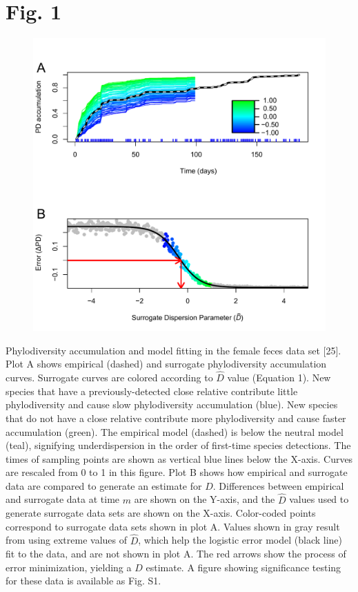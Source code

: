 \documentclass{article}
\begin{document}
\section*{Fig. 1}
\begin{figure}[ht]
	\centering
	\includegraphics[scale=0.80]{../Fig_1.pdf}
\end{figure}
Phylodiversity accumulation and model fitting in the female feces data set [25]. Plot A shows empirical (dashed) and surrogate phylodiversity accumulation curves. Surrogate curves are colored according to \(\hat{D}\) value (Equation 1). New species that have a previously-detected close relative contribute little phylodiversity and cause slow phylodiversity accumulation (blue). New species that do not have a close relative contribute more phylodiversity and cause faster accumulation (green). The empirical model (dashed) is below the neutral model (teal), signifying underdispersion in the order of first-time species detections. The times of sampling points are shown as vertical blue lines below the X-axis. Curves are rescaled from 0 to 1 in this figure. Plot B shows how empirical and surrogate data are compared to generate an estimate for \(D\). Differences between empirical and surrogate data at time \(m\) are shown on the Y-axis, and the \(\hat{D}\) values used to generate surrogate data sets are shown on the X-axis. Color-coded points correspond to surrogate data sets shown in plot A. Values shown in gray result from using extreme values of \(\hat{D}\), which help the logistic error model (black line) fit to the data, and are not shown in plot A. The red arrows show the process of error minimization, yielding a \(D\) estimate. A figure showing significance testing for these data is available as Fig. S1.
%
\newpage
%
%
\end{document}
